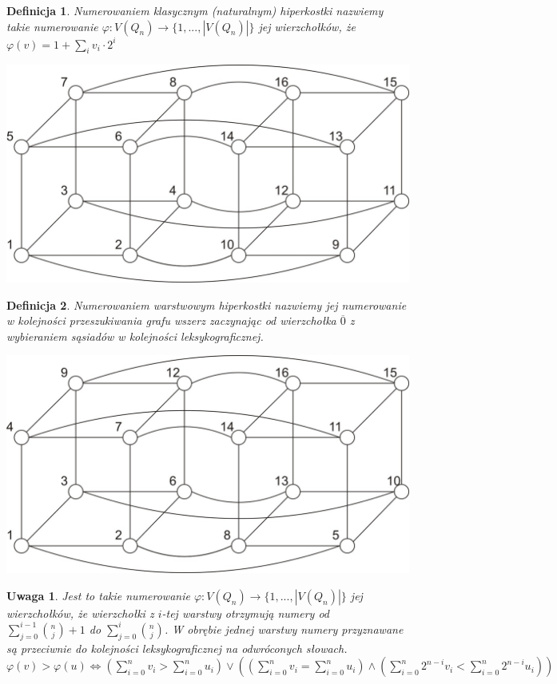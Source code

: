 \documentclass{pracamgr}
\newtheorem{defi}{Definicja}[section] %
\newtheorem{remark}[theorem]{Uwaga}
\begin{document}
    \begin{defi}\label{numerowanie klasyczne}
     \emph{Numerowaniem klasycznym (naturalnym)} hiperkostki nazwiemy takie numerowanie $\varphi:V(Q_n)\rightarrow\{1,...,|V(Q_n)|\}$ jej wierzchołków, że
     $\varphi(v)=1+\sum_{i}v_i\cdot2^i$
    \end{defi}
    \begin{center}
     \includegraphics[scale=0.6]{img/Q_4_klasyczne.jpg}
    \end{center}
    \begin{defi}\label{numerowanie warstwowe}%
     \emph{Numerowaniem warstwowym} hiperkostki nazwiemy jej numerowanie w kolejności przeszukiwania grafu wszerz zaczynając od wierzchołka $\overline{0}$
     z wybieraniem sąsiadów w kolejności leksykograficznej.
    \end{defi}
    \begin{center}
    \includegraphics[scale=0.6]{img/Q_4_warstwowe.jpg}
   \end{center}   
    \begin{remark}\label{numerowanie warstwowe 2}
     Jest to takie numerowanie $\varphi:V(Q_n)\rightarrow\{1,...,|V(Q_n)|\}$ jej wierzchołków,
     że wierzchołki z $i$-tej warstwy otrzymują numery od $\sum_{j=0}^{i-1}{n\choose j}+1$ do $\sum_{j=0}^{i}{n\choose j}$.
     W obrębie jednej warstwy numery przyznawane są przeciwnie do kolejności leksykograficznej na odwróconych słowach.
     $\varphi(v)>\varphi(u)\Leftrightarrow (\sum_{i=0}^n v_i>\sum_{i=0}^n u_i)
     \vee((\sum_{i=0}^n v_i=\sum_{i=0}^n u_i)\wedge(\sum_{i=0}^n2^{n-i}v_i<\sum_{i=0}^n2^{n-i}u_i))$
    \end{remark}
\end{document}
